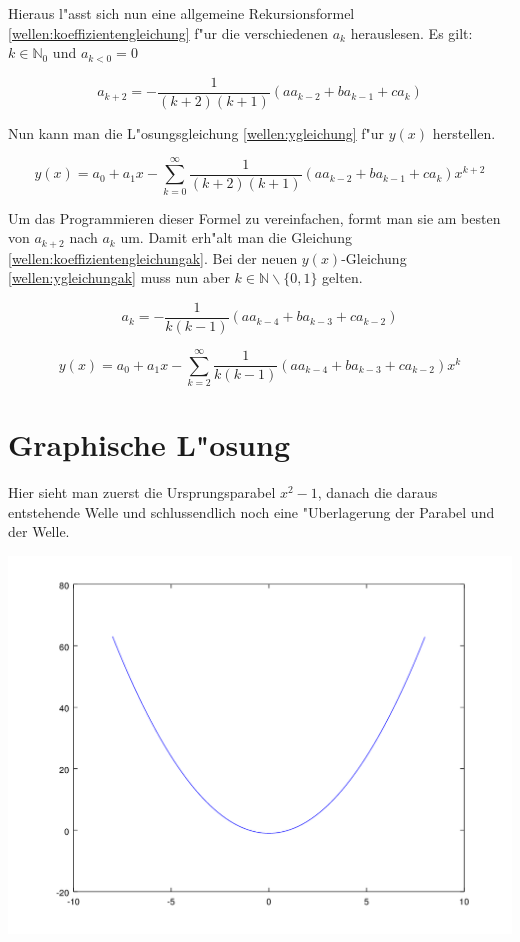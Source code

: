 \begin{refsection}
Hieraus l"asst sich nun eine allgemeine Rekursionsformel 
\ref{wellen:koeffizientengleichung} f"ur die verschiedenen $a_k$ herauslesen. 
Es gilt: $k \in \mathbb{N}_0$ und	$a_{k < 0} = 0$

\begin{equation}
	a_{k+2} = -\frac{1}{(k+2)(k+1)} (aa_{k-2}+ba_{k-1}+ca_k)
	\label{wellen:koeffizientengleichung}
\end{equation}

Nun kann man die L"osungsgleichung \ref{wellen:ygleichung} f"ur $y(x)$ 
herstellen.

\begin{equation}
	y(x) = a_0 + a_1x 
	-\sum_{k=0}^{\infty}\frac{1}{(k+2)(k+1)}(aa_{k-2}+ba_{k-1}+ca_k)x^{k+2}
	\label{wellen:ygleichung}
\end{equation}

Um das Programmieren dieser Formel zu vereinfachen, formt man sie am besten von 
$a_{k+2}$ nach $a_k$ um. Damit erh"alt man die Gleichung 
\ref{wellen:koeffizientengleichungak}.
Bei der neuen $y(x)$-Gleichung \ref{wellen:ygleichungak} muss nun aber $k \in 
\mathbb{N} \backslash \{0, 1\}$ gelten.

\begin{equation}
	a_{k} = -\frac{1}{k(k-1)} (aa_{k-4}+ba_{k-3}+ca_{k-2})
	\label{wellen:koeffizientengleichungak}
\end{equation}

\begin{equation}
	y(x) = a_0 + a_1x 
	-\sum_{k=2}^{\infty}\frac{1}{k(k-1)}(aa_{k-4}+ba_{k-3}+ca_{k-2})x^k
	\label{wellen:ygleichungak}
\end{equation}

\section{Graphische L"osung}

Hier sieht man zuerst die Ursprungsparabel $x^2-1$, danach die daraus 
entstehende Welle und schlussendlich noch eine "Uberlagerung der Parabel und 
der Welle.

\includegraphics[scale=0.6]{./wellen/octave/images/parabel.png}


\end{refsection}
